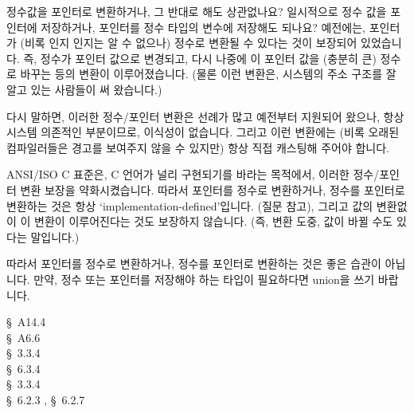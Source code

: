 \begin{faq}
        정수값을 포인터로 변환하거나, 그 반대로 해도 상관없나요? 일시적으로 정수 값을 포인터에
        저장하거나, 포인터를 정수 타입의 변수에 저장해도 되나요?
\A
        예전에는, 포인터가 (비록 인지 인지는 알 수 없으나) 정수로
        변환될 수 있다는 것이 보장되어 있었습니다. 즉, 정수가 포인터 값으로 변경되고, 다시
        나중에 이 포인터 값을 (충분히 큰) 정수로 바꾸는 등의 변환이 이루어졌습니다. (물론
        이런 변환은, 시스템의 주소 구조를 잘 알고 있는 사람들이 써 왔습니다.)

        다시 말하면, 이러한 정수/포인터 변환은 선례가 많고 예전부터 지원되어 왔으나, 항상
        시스템 의존적인 부분이므로, 이식성이 없습니다. 그리고 이런 변환에는 (비록 오래된 컴파일러들은
        경고를 보여주지 않을 수 있지만) 항상 직접 캐스팅해 주어야 합니다.

        ANSI/ISO C 표준은, C 언어가 널리 구현되기를 바라는 목적에서, 이러한 정수/포인터
        변환 보장을 약화시켰습니다. 따라서 포인터를 정수로 변환하거나, 정수를 포인터로 변환하는 것은
        항상 `implementation-defined'입니다. (질문  참고), 그리고 값의 변환없이
        이 변환이 이루어진다는 것도 보장하지 않습니다.
        (즉, 변환 도중, 값이 바뀔 수도 있다는 말입니다.)

        따라서 포인터를 정수로 변환하거나, 정수를 포인터로 변환하는 것은 좋은 습관이 아닙니다.
        만약, 정수 또는 포인터를 저장해야 하는 타입이 필요하다면 union을 쓰기 바랍니다.

\R
        \cite{kr1} \S\ A14.4  \\
        \cite{kr2} \S\ A6.6  \\
        \cite{ansi} \S\ 3.3.4 \\
        \cite{c89} \S\ 6.3.4 \\
        \cite{rationale} \S\ 3.3.4 \\
        \cite{hs} \S\ 6.2.3 , \S\ 6.2.7 
\end{faq}

%
%
